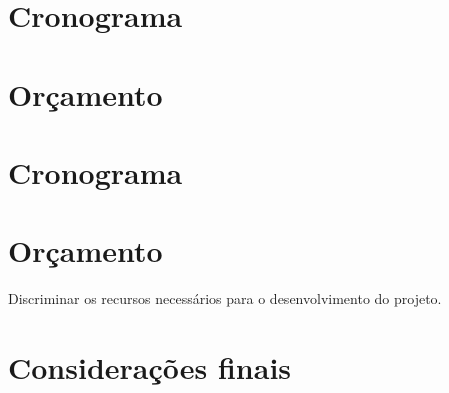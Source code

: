 \documentclass[12pt,openright,a4paper,brazil]{abntex2}
\begin{document}
\chapter{Cronograma}

\chapter{Orçamento}

\chapter{Cronograma}

\chapter{Orçamento}
Discriminar os recursos necessários para o desenvolvimento do projeto.


\chapter*[Considerações finais]{Considerações finais}

\postextual




\printindex
\end{document}
